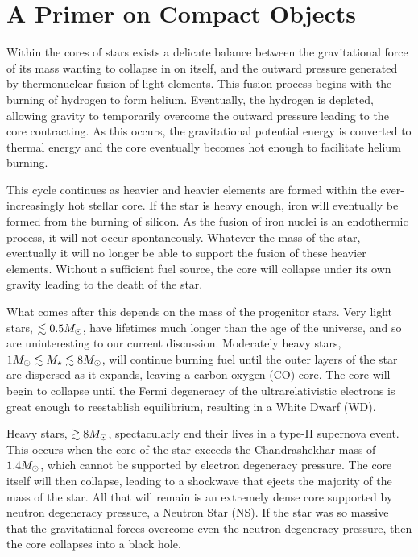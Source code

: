 \graphicspath{{img/chapter_2/}}



\chapter{A Primer on Compact Objects}
\label{chapter:compactobjects}


Within the cores of stars exists a delicate balance between the gravitational force of its mass wanting to collapse in on itself, and the outward pressure generated by thermonuclear fusion of light elements. This fusion process begins with the burning of hydrogen to form helium. Eventually, the hydrogen is depleted, allowing gravity to temporarily overcome the outward pressure leading to the core contracting. As this occurs, the gravitational potential energy is converted to thermal energy and the core eventually becomes hot enough to facilitate helium burning. 

This cycle continues as heavier and heavier elements are formed within the ever-increasingly hot stellar core.
If the star is heavy enough, iron will eventually be formed from the burning of silicon. As the fusion of iron nuclei is an endothermic process, it will not occur spontaneously. Whatever the mass of the star, eventually it will no longer be able to support the fusion of these heavier elements. Without a sufficient fuel source, the core will collapse under its own gravity leading to the death of the star.  

What comes after this depends on the mass of the progenitor stars. Very light stars, $\lesssim 0.5 M_\odot$, have lifetimes much longer than the age of the universe, and so are uninteresting to our current discussion. Moderately heavy stars, $1M_\odot\lesssim M_\star \lesssim 8M_\odot$, will continue burning fuel until the outer layers of the star are dispersed as it expands, leaving a carbon-oxygen (CO) core. The core will begin to collapse until the Fermi degeneracy of the ultrarelativistic electrons is great enough to reestablish equilibrium, resulting in a White Dwarf (WD).

Heavy stars, $\gtrsim 8M_\odot$, spectacularly end their lives in a type-II supernova event. This occurs when the core of the star exceeds the Chandrashekhar mass of $1.4M_\odot$, which cannot be supported by electron degeneracy pressure. The core itself will then collapse, leading to a shockwave that ejects the majority of the mass of the star. All that will remain is an extremely dense core supported by neutron degeneracy pressure, a Neutron Star (NS). If the star was so massive that the gravitational forces overcome even the neutron degeneracy pressure, then the core collapses into a black hole. 

